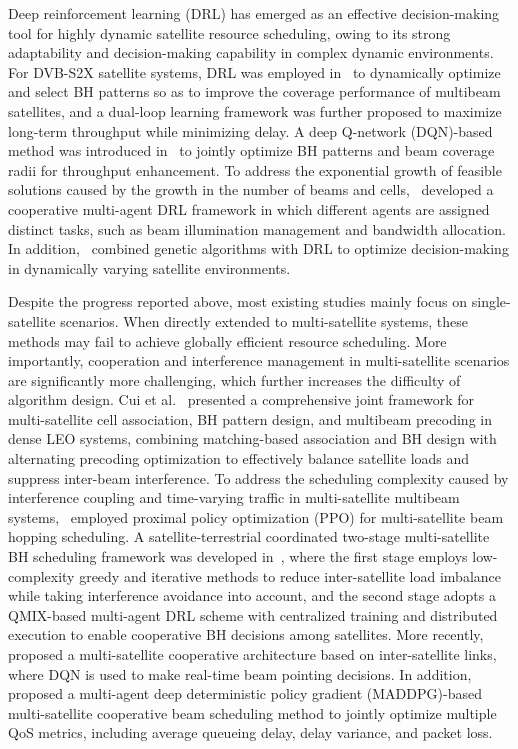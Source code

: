 \documentclass[journal]{IEEEtran}
\newcommand{\revbegin}[1]{\color{revisionblue}\ignorespaces}
\newcommand{\revend}[1]{\color{black}\ignorespaces}
\begin{document}
Deep reinforcement learning (DRL) has emerged as an effective decision-making tool for highly dynamic satellite resource scheduling, owing to its strong adaptability and decision-making capability in complex dynamic environments. For DVB-S2X satellite systems, DRL was employed in~\cite{ref16} to dynamically optimize and select BH patterns so as to improve the coverage performance of multibeam satellites, and a dual-loop learning framework was further proposed to maximize long-term throughput while minimizing delay. A deep Q-network (DQN)-based method was introduced in~\cite{ref17} to jointly optimize BH patterns and beam coverage radii for throughput enhancement. To address the exponential growth of feasible solutions caused by the growth in the number of beams and cells,~\cite{ref18} developed a cooperative multi-agent DRL framework in which different agents are assigned distinct tasks, such as beam illumination management and bandwidth allocation. In addition,~\cite{ref19} combined genetic algorithms with DRL to optimize decision-making in dynamically varying satellite environments.

\revbegin{}Despite the progress reported above, most existing studies mainly focus on single-satellite scenarios. When directly extended to multi-satellite systems, these methods may fail to achieve globally efficient resource scheduling. More importantly, cooperation and interference management in multi-satellite scenarios are significantly more challenging, which further increases the difficulty of algorithm design. Cui et al.~\cite{refCuiPrecoding2025} presented a comprehensive joint framework for multi-satellite cell association, BH pattern design, and multibeam precoding in dense LEO systems, combining matching-based association and BH design with alternating precoding optimization to effectively balance satellite loads and suppress inter-beam interference. To address the scheduling complexity caused by interference coupling and time-varying traffic in multi-satellite multibeam systems,~\cite{ref20} employed proximal policy optimization (PPO) for multi-satellite beam hopping scheduling. A satellite-terrestrial coordinated two-stage multi-satellite BH scheduling framework was developed in~\cite{ref21}, where the first stage employs low-complexity greedy and iterative methods to reduce inter-satellite load imbalance while taking interference avoidance into account, and the second stage adopts a QMIX-based multi-agent DRL scheme with centralized training and distributed execution to enable cooperative BH decisions among satellites. More recently,~\cite{ref22} proposed a multi-satellite cooperative architecture based on inter-satellite links, where DQN is used to make real-time beam pointing decisions. In addition,~\cite{ref23} proposed a multi-agent deep deterministic policy gradient (MADDPG)-based multi-satellite cooperative beam scheduling method to jointly optimize multiple QoS metrics, including average queueing delay, delay variance, and packet loss.\revend{}
\end{document}
